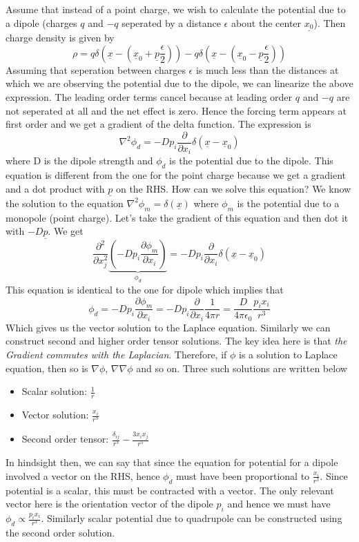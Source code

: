 \documentclass[11pt, letterpaper]{article}
\newcommand{\dij}{\delta_{ij}}
\newcommand{\1}{\bm{1}}
\newcommand{\pd}[2]{\frac{\partial #1}{\partial #2}}
\newcommand{\un}[1]{\underline{#1}}
\begin{document}
Assume that instead of a point charge, we wish to calculate the potential due to a dipole (charges $q$ and $-q$ seperated by a distance $\epsilon$ about the center $\un{x_0}$). Then charge density is given by
$$
\rho = q\delta(\un{x}- (\un{x}_0+\un{p} \frac{\epsilon}{2})) - q\delta(\un{x}-(\un{x}_0-\un{p}\frac{\epsilon}{2}))
$$
Assuming that seperation between charges $\epsilon$ is much less than the distances at which we are observing the potential due to the dipole, we can linearize the above expression. The leading order terms cancel because at leading order $q$ and $-q$ are not seperated at all and the net effect is zero. Hence the forcing term appears at first order and we get a gradient of the delta function. The expression is
$$
\nabla ^2\phi_d = -D p_i\pd{}{x_i}\delta(\un{x}-\un{x}_0)
$$
where D is the dipole strength and $\phi_d$ is the potential due to the dipole. This equation is different from the one for the point charge because we get a gradient and a dot product with $\un{p}$ on the RHS. How can we solve this equation? We know the solution to the equation $\nabla ^2 \phi_m = \delta(\un{x})$ where $\phi_m$ is the potential due to a monopole (point charge). Let's take the gradient of this equation and then dot it with $-D\un{p}$. We get
$$
\frac{\partial ^2}{\partial x_j^2}\underbrace{(-Dp_i\pd{\phi_m}{x_i})}_{\phi_d} = -D p_i\pd{}{x_i}\delta(\un{x}-\un{x}_0)
$$
This equation is identical to the one for dipole which implies that
$$
\phi_d = -Dp_i\pd{\phi_m}{x_i} = -Dp_i\pd{}{x_i}\frac{1}{4\pi r} = \frac{D}{4 \pi \epsilon_0}\frac{p_i x_i}{r^3}
$$
Which gives us the vector solution to the Laplace equation. Similarly we can construct second and higher order tensor solutions. The key idea here is that \textit{the Gradient commutes with the Laplacian}. Therefore, if $\phi$ is a solution to Laplace equation, then so is $\nabla \phi$, $\nabla \nabla \phi$ and so on. Three such solutions are written below
\begin{itemize}
\item Scalar solution: $\frac{1}{r}$
\item Vector solution: $\frac{x_i}{r^3}$
\item Second order tensor: $\frac{\dij}{r^3} - \frac{3x_ix_j}{r^5}$
\end{itemize}

In hindsight then, we can say that since the equation for potential for a dipole involved a vector on the RHS, hence $\phi_d$ must have been proportional to $\frac{x_i}{r^3}$. Since potential is a scalar, this must be contracted with a vector. The only relevant vector here is the orientation vector of the dipole $p_i$ and hence we must have $\phi_d \propto \frac{p_ix_i}{r^3}$. Similarly scalar potential due to quadrupole can be constructed using the second order solution.
\end{document}
